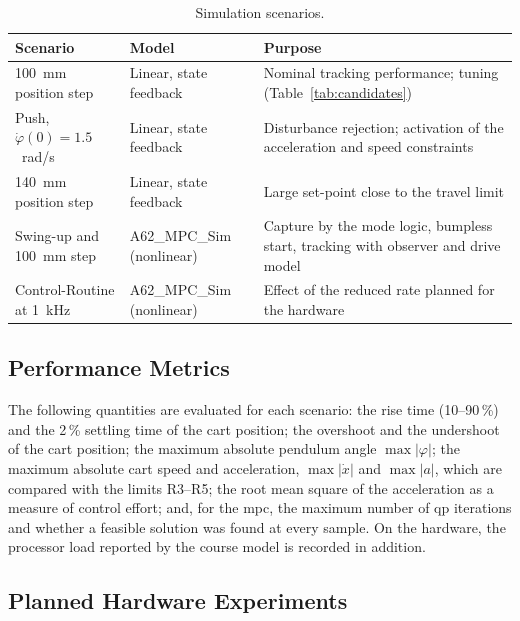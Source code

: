 \begin{table}[ht]
\centering
\caption{Simulation scenarios.}
\label{tab:scenarios}
\begin{tabular}{p{}p{}p{}}
\toprule
Scenario & Model & Purpose \\
\midrule
100~mm position step & Linear, state feedback & Nominal tracking performance; tuning (Table~\ref{tab:candidates}) \\
Push, $\dot{\varphi}(0) = 1.5$~rad/s & Linear, state feedback & Disturbance rejection; activation of the acceleration and speed constraints \\
140~mm position step & Linear, state feedback & Large set-point close to the travel limit \\
Swing-up and 100~mm step & A62\_MPC\_Sim (nonlinear) & Capture by the mode logic, bumpless start, tracking with observer and drive model \\
Control-Routine at 1~kHz & A62\_MPC\_Sim (nonlinear) & Effect of the reduced rate planned for the hardware \\
\bottomrule
\end{tabular}
\end{table}

\subsection{Performance Metrics}
\label{subsec:metrics}

The following quantities are evaluated for each scenario:
the rise time (10--90\,\%) and the 2\,\% settling time of the cart position;
the overshoot and the undershoot of the cart position; the maximum absolute
pendulum angle $\max|\varphi|$; the maximum absolute cart speed and
acceleration, $\max|\dot{x}|$ and $\max|a|$, which are compared with the limits
R3--R5; the root mean square of the acceleration as a measure of control
effort; and, for the \ac{mpc}, the maximum number of \ac{qp} iterations and
whether a feasible solution was found at every sample. On the hardware, the
processor load reported by the course model is recorded in addition.

\subsection{Planned Hardware Experiments}
\label{subsec:hwplan}

